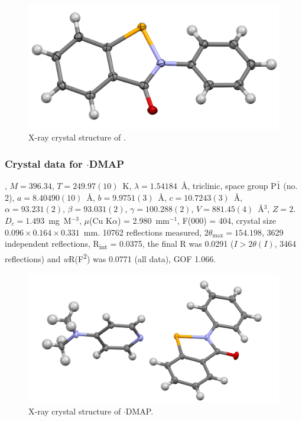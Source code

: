\begin{refsection}
\begin{figure}
  \includegraphics[width=0.6\linewidth]{Figures/ebs-xtal.pdf}
  \caption{X-ray crystal structure of \texorpdfstring{}{C13 H9 N O Se}.}
\end{figure}

\subsubsection{Crystal data for \texorpdfstring{$\cdot$DMAP}{C20 H19 N3 O Se}}
, $M=396.34$, $T=249.97(10)$~K, $\lambda=1.54184$~\AA, triclinic, space group P$\bar{1}$ (no. 2), $a = 8.40490(10)$~\AA, $b = 9.9751(3)$~\AA, $c = 10.7243(3)$~\AA, $\alpha = 93.231(2)$\degree, $\beta = 93.031(2)$\degree, $\gamma = 100.288(2)$\degree, $V = 881.45(4)$~\AA$^{3}$, $Z = 2$. $D_{c}= 1.493$~mg~M$^{-3}$, $\mu$(Cu K$\alpha$) = 2.980~mm$^{-1}$, F(000) = 404, crystal size $0.096 \times 0.164 \times 0.331$~mm. 10762 reflections measured, $2\theta_{\mathrm{max}}=154.198$\degree, 3629 independent reflections, R\textsubscript{int} = 0.0375, the final R was 0.0291 ($I > 2\theta(I)$, 3464 reflections) and \emph{w}R(F\textsuperscript{2}) was 0.0771 (all data), GOF 1.066.

\begin{figure}
  \includegraphics[width=0.6\linewidth]{Figures/ebs-dmap-xtal.pdf}
  \caption{X-ray crystal structure of \texorpdfstring{$\cdot$DMAP}{C20 H19 N3 O Se}.}
\end{figure}


\end{refsection}
